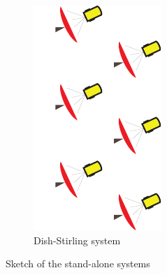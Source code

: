 \begin{figure}[htbp]
\begin{subfigure}[b]{0.266\columnwidth}
	\includegraphics[width = \columnwidth]{fig/Dish-s}
	\caption{Dish-Stirling system}\label{fig:DishStirling}
	\end{subfigure}
	
	\caption{Sketch of the stand-alone systems}\label{fig:Stand-alone-systems}
\end{figure}


